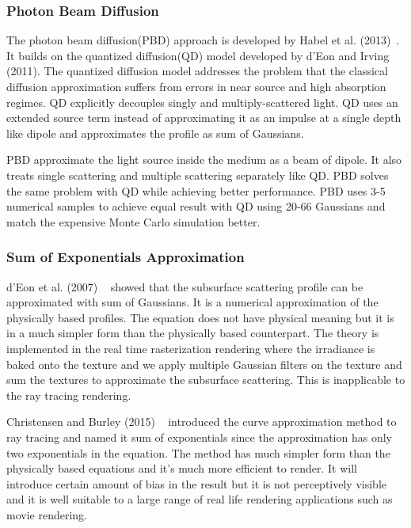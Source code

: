 \documentclass[letterpaper,12pt]{article}
\begin{document}
\subsubsection{Photon Beam Diffusion}
The photon beam diffusion(PBD) approach is developed by Habel et al. (2013)~\cite{habel2013photon}. It builds on the quantized diffusion(QD) model developed by d’Eon and Irving (2011)\cite{d2011quantized}. The quantized diffusion model addresses the problem that the classical diffusion approximation suffers from errors in near source and high absorption regimes. QD explicitly decouples singly and multiply-scattered light. QD uses an extended source term instead of approximating it as an impulse at a single depth like dipole and approximates the profile as sum of Gaussians. 

PBD approximate the light source inside the medium as a beam of dipole. It also treats single scattering and multiple scattering separately like QD. PBD solves the same problem with QD while achieving better performance. PBD uses 3-5 numerical samples to achieve equal result with QD using 20-66 Gaussians and match the expensive Monte Carlo simulation better.

\subsubsection{Sum of Exponentials Approximation}
d’Eon et al. (2007) ~\cite{d2007efficient} showed that the subsurface scattering profile can be approximated with sum of Gaussians. It is a numerical approximation of the physically based profiles. The equation does not have physical meaning but it is in a much simpler form than the physically based counterpart. The theory is implemented in the real time rasterization rendering where the irradiance is baked onto the texture and we apply multiple Gaussian filters on the texture and sum the textures to approximate the subsurface scattering. This is inapplicable to the ray tracing rendering.

Christensen and Burley (2015) ~\cite{christensen2015approximate} introduced the curve approximation method to ray tracing and named it sum of exponentials since the approximation has only two exponentials in the equation. The method has much simpler form than the physically based equations and it's much more efficient to render. It will introduce certain amount of bias in the result but it is not perceptively visible and it is well suitable to a large range of real life rendering applications such as movie rendering.
\end{document}
